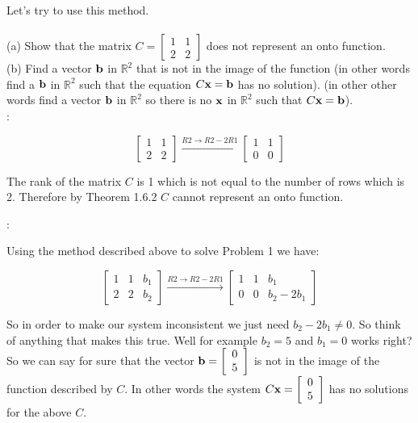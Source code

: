 \documentclass[12pt]{article}
\begin{document}
\noindent  Let's try to use this method.\\
 \\

\noindent (a) Show that the matrix $C=\left[ \begin{array}{cc} 1 &1  \\ 2 & 2  \end{array} \right]$ does not represent an onto function. \\

\noindent (b) Find a vector ${\bf b}$ in $\mathbb{R}^2$ that is not in the image of the function (in other words find a ${\bf b}$ in $\mathbb{R}^2$ such that the equation $C{\bf x}={\bf b}$ has no solution).  (in other other words find a vector ${\bf b}$ in $\mathbb{R}^2$ so there is no ${\bf x}$ in $\mathbb{R}^2$ such that $C{\bf x} = {\bf b}$). \\


:  

\[ \left[ \begin{array}{cc} 1 &1  \\ 2 & 2  \end{array} \right] 
\xrightarrow[]{R2\rightarrow R2-2R1}  
\left[  \begin{array}{cc} 1 &1  \\ 0 & 0  \end{array} \right] \]

\noindent The rank of the matrix $C$ is 1 which is not equal to the number of rows which is 2.  Therefore by Theorem 1.6.2 $C$ cannot represent an onto function.

:  

\noindent Using the method described above to solve Problem 1 we have:

\[ \left[ 
\begin{array}{cc|c} 1 &1 & b_1 \\ 2 & 2 & b_2 \end{array} \right] 
\xrightarrow[]{R2\rightarrow R2-2R1} 
\left[  \begin{array}{cc|c} 1 &1 & b_1 \\ 0 & 0 & b_2-2b_1 \end{array} \right] \]

\noindent So in order to make our system inconsistent we just need $b_2-2b_1 \neq 0$.  So think of anything that makes this true.  Well for example $b_2=5$ and $b_1=0$ works right? So we can say for sure that the vector ${\bf b}=\left[ \begin{array}{c} 0 \\ 5 \end{array} \right]$ is not in the image of the function described by $C$.  In other words the system $C {\bf x} =  \left[ \begin{array}{c} 0 \\ 5 \end{array} \right]$ has no solutions for the above $C$.
\end{document}
